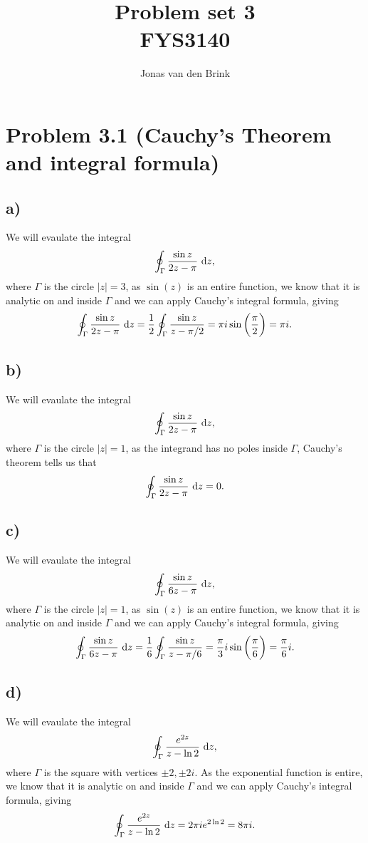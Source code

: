 \documentclass[a4paper, 11pt, titlepage, english]{article}
\author{Jonas van den Brink}
\title{Problem set 3 \\ FYS3140}
\renewcommand{\d}{{\rm d}}
\begin{document}
\maketitle
\newpage\null\thispagestyle{empty}\newpage

\setcounter{page}{1} 

\section*{Problem 3.1 (Cauchy's Theorem and integral formula)}
\subsection*{a)}
We will evaulate the integral
$$\oint_\Gamma \frac{\sin z}{2z - \pi} \ \d z,$$
where $\Gamma$ is the circle $|z|=3$, as $\sin(z)$ is an entire function, we know that it is analytic on and inside $\Gamma$ and we can apply Cauchy's integral formula, giving
$$\oint_\Gamma \frac{\sin z}{2z - \pi} \ \d z = \frac{1}{2}\oint_\Gamma \frac{\sin z}{z - \pi/2} = \pi i \sin\bigg(\frac{\pi}{2}\bigg) = \pi i.$$

\subsection*{b)}
We will evaulate the integral
$$\oint_\Gamma \frac{\sin z}{2z - \pi} \ \d z,$$
where $\Gamma$ is the circle $|z|=1$, as the integrand has no poles inside $\Gamma$, Cauchy's theorem tells us that
$$\oint_\Gamma \frac{\sin z}{2z - \pi} \ \d z = 0.$$

\subsection*{c)}
We will evaulate the integral
$$\oint_\Gamma \frac{\sin z}{6z - \pi} \ \d z,$$
where $\Gamma$ is the circle $|z|=1$, as $\sin(z)$ is an entire function, we know that it is analytic on and inside $\Gamma$ and we can apply Cauchy's integral formula, giving
$$\oint_\Gamma \frac{\sin z}{6z - \pi} \ \d z = \frac{1}{6}\oint_\Gamma \frac{\sin z}{z - \pi/6} = \frac{\pi}{3} i \sin\bigg(\frac{\pi}{6}\bigg) = \frac{\pi}{6}i.$$

\subsection*{d)}
We will evaulate the integral
$$\oint_\Gamma \frac{e^{2z}}{z-\ln 2} \ \d z,$$
where $\Gamma$ is the square with vertices $\pm 2, \pm 2i$. As the exponential function is entire, we know that it is analytic on and inside $\Gamma$ and we can apply Cauchy's integral formula, giving
$$\oint_\Gamma \frac{e^{2z}}{z-\ln 2} \ \d z = 2\pi i e^{2\ln 2} = 8\pi i.$$
\end{document}
